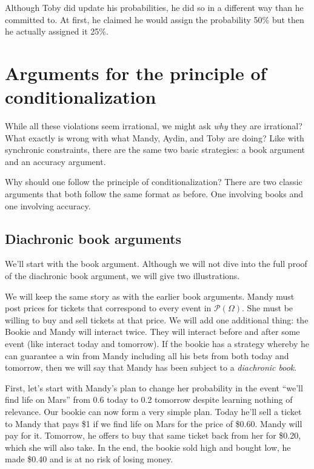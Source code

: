 Although Toby did update his probabilities, he did so in a different way than he committed to.  At first, he claimed he would assign the probability 50\% but then he actually assigned it 25\%.

\section{Arguments for the principle of conditionalization}

While all these violations seem irrational, we might ask {\it why} they are irrational?  What exactly is wrong with what Mandy, Aydin, and Toby are doing?  Like with synchronic constraints, there are the same two basic strategies: a book argument and an accuracy argument.

Why should one follow the principle of conditionalization?  There are two classic arguments that both follow the same format as before.  One involving books and one involving accuracy. 

\subsection{Diachronic book arguments}

We'll start with the book argument. Although we will not dive into the full proof of the diachronic book argument, we will give two illustrations.

We will keep the same story as with the earlier book arguments.  Mandy must post prices for tickets that correspond to every event in $\mathscr{P}(\Omega)$. She must be willing to buy and sell tickets at that price.  We will add one additional thing: the Bookie and Mandy will interact twice. They will interact before and after some event (like interact today and tomorrow).  If the bookie has a strategy whereby he can guarantee a win from Mandy including all his bets from both today and tomorrow, then we will say that Mandy has been subject to a {\it diachronic book}. 

First, let's start with Mandy's plan to change her probability in the event ``we'll find life on Mars'' from 0.6 today to 0.2 tomorrow despite learning nothing of relevance.  Our bookie can now form a very simple plan.  Today he'll sell a ticket to Mandy that pays \$1 if we find life on Mars for the price of \$0.60.  Mandy will pay for it.  Tomorrow, he offers to buy that same ticket back from her for \$0.20, which she will also take.  In the end, the bookie sold high and bought low, he made \$0.40 and is at no risk of losing money. 

